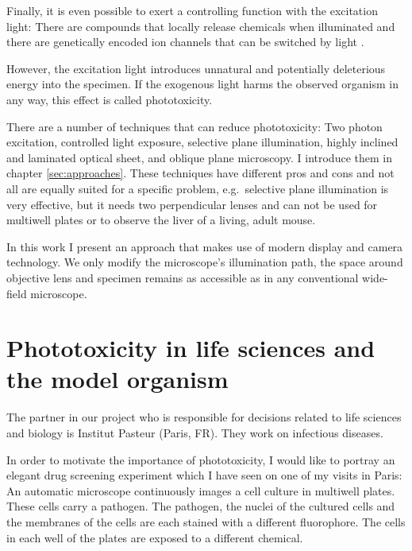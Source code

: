 Finally, it is even possible to exert a controlling function with the
excitation light: There are compounds that locally release chemicals
when illuminated and there are  genetically encoded ion channels that can be
switched by light \citep{Boyden2005}.

However, the excitation light introduces unnatural and potentially
deleterious energy into the specimen. If the exogenous light harms the
observed organism in any way, this effect is called phototoxicity.


There are a number of techniques that can reduce phototoxicity: Two
photon excitation, controlled light exposure, selective plane
illumination, highly inclined and laminated optical sheet, and oblique
plane microscopy. I introduce them in
chapter \ref{sec:approaches}. These techniques have different
pros and cons and not all are equally suited for a specific problem,
e.g.\ selective plane illumination is very effective, but it needs two
perpendicular lenses and can not be used for multiwell plates or to
observe the liver of a living, adult mouse.

In this work I present an approach that makes use of modern display
and camera technology. We only modify the microscope's illumination
path, the space around objective lens and specimen remains as
accessible as in any conventional wide-field microscope.



\section{Phototoxicity in life sciences and the model organism
  \celegans}
\label{sec:intro-phototoxicity}
The partner in our project who is responsible for decisions related to
life sciences and biology is Institut Pasteur (Paris, FR). They work
on infectious diseases. 

In order to motivate the importance of phototoxicity, I would like to
portray an elegant drug screening experiment which I have seen on one
of my visits in Paris: An automatic microscope continuously images a
cell culture in multiwell plates. These cells carry a pathogen. The
pathogen, the nuclei of the cultured cells and the membranes of the
cells are each stained with a different fluorophore. The cells in each
well of the plates are exposed to a different chemical.

